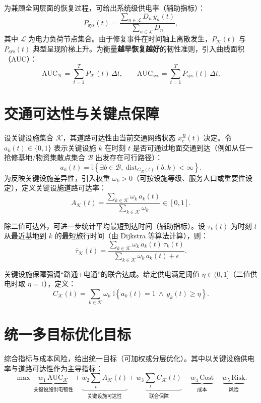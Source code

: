 \documentclass[UTF8,zihao=-4,a4paper,fontset=fandol]{ctexrep}
\begin{document}
为兼顾全网层面的恢复过程，可给出系统级供电率（辅助指标）：
\begin{equation}
  P_{\text{sys}}(t)=\frac{\sum_{n\in\mathcal{L}} D_n\,y_n(t)}{\sum_{n\in\mathcal{L}} D_n},
\end{equation}
其中 $\mathcal{L}$ 为电力负荷节点集合。由于修复事件在时间轴上离散发生，$P_{\mathcal{K}}(t)$ 与 $P_{\text{sys}}(t)$ 典型呈现阶梯上升。为衡量\textbf{越早恢复越好}的韧性准则，引入曲线面积（AUC）：
\begin{equation}
  \text{AUC}_{\mathcal{K}}=\sum_{t=1}^{T} P_{\mathcal{K}}(t)\,\Delta t,\qquad
  \text{AUC}_{\text{sys}}=\sum_{t=1}^{T} P_{\text{sys}}(t)\,\Delta t.
\end{equation}

\section{交通可达性与关键点保障}
设关键设施集合 $\mathcal{K}$，其道路可达性由当前交通网络状态 $x^R_e(t)$ 决定。令 $a_k(t)\in\{0,1\}$ 表示关键设施 $k$ 在时刻 $t$ 是否可通过地面交通到达（例如从任一抢修基地/物资集散点集合 $\mathcal{B}$ 出发存在可行路径）：
\begin{equation}
  a_k(t)=\mathbb{I}\left\{\exists b\in\mathcal{B},\ \mathrm{dist}_{G_R(t)}(b,k)<\infty \right\}.
\end{equation}
为反映关键设施差异性，引入权重 $\omega_k>0$（可按设施等级、服务人口或重要性设定），定义关键设施道路可达率：
\begin{equation}
  A_{\mathcal{K}}(t)=\frac{\sum_{k\in\mathcal{K}} \omega_k\, a_k(t)}{\sum_{k\in\mathcal{K}} \omega_k}\in[0,1].
\end{equation}

除二值可达外，可进一步统计平均最短到达时间（辅助指标）。设 $\tau_k(t)$ 为时刻 $t$ 从最近基地到 $k$ 的最短旅行时间（由 Dijkstra 等算法计算），则：
\begin{equation}
  \bar{\tau}_{\mathcal{K}}(t)=\frac{\sum_{k\in\mathcal{K}} \omega_k\, a_k(t)\,\tau_k(t)}{\sum_{k\in\mathcal{K}} \omega_k\, a_k(t)+\epsilon}.
\end{equation}

关键设施保障强调“路通+电通”的联合达成。给定供电满足阈值 $\eta\in(0,1]$（二值供电时取 $\eta=1$），定义：
\begin{equation}
  C_{\mathcal{K}}(t)=\sum_{k\in\mathcal{K}} \omega_k\ \mathbb{I}\left\{a_k(t)=1\ \wedge\ y_k(t)\ge \eta\right\}.
\end{equation}

\section{统一多目标优化目标}
综合指标与成本风险，给出统一目标（可加权或分层优化）。其中以关键设施供电率与道路可达性作为主导指标：
\begin{equation}
\max \ 
\underbrace{w_1\,\text{AUC}_{\mathcal{K}}}_{\text{关键设施供电韧性}}
+\underbrace{w_2\sum_{t}A_{\mathcal{K}}(t)}_{\text{关键设施可达性}}
+\underbrace{w_3\sum_{t}C_{\mathcal{K}}(t)}_{\text{联合保障}}
-\underbrace{w_4\,\text{Cost}}_{\text{成本}}
-\underbrace{w_5\,\text{Risk}}_{\text{风险}}.
\end{equation}
\end{document}

